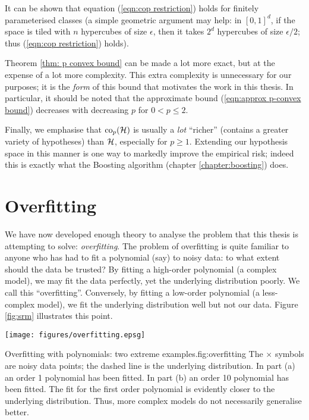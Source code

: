 It can be shown that equation (\ref{eqn:cop restriction}) holds for
finitely parameterised classes (a simple geometric argument may help:
in $[0,1]^d$, if the space is tiled with $n$ hypercubes of size
$\epsilon$, then it takes $2^d$ hypercubes of size $\epsilon/2$; thus
(\ref{eqn:cop restriction}) holds).
 
Theorem \ref{thm: p convex bound} can be made a lot more exact, but at
the expense of a lot more complexity.  This extra complexity is
unnecessary for our purposes; it is the \emph{form} of this bound that
motivates the work in this thesis. In particular, it should be noted
that the approximate bound (\ref{eqn:approx p-convex bound}) decreases
with decreasing $p$ for $0 < p \leq 2$.

Finally, we emphasise that $\mathrm{co}_{p}(\mathcal{H})$ is usually a \emph{lot}
``richer'' (contains a greater variety of hypotheses) than $\mathcal{H}$,
especially for $p \geq 1$.  Extending our hypothesis space in this
manner is one way to markedly improve the empirical risk; indeed this
is exactly what the Boosting algorithm (chapter
\ref{chapter:boosting}) does.


\section{Overfitting}
\label{sec:overfitting}

We have now developed enough theory to analyse the problem that
this thesis is attempting to solve: \emph{overfitting}.  The problem
of overfitting is quite familiar to anyone who has had to fit a
polynomial (say) to noisy data: to what extent should the data be
trusted?  By fitting a high-order polynomial (a complex model), we may
fit the data perfectly, yet the underlying distribution poorly.  We
call this ``overfitting''.  Conversely, by fitting a low-order
polynomial (a less-complex model), we fit the underlying distribution
well but not our data.  Figure \ref{fig:srm} illustrates this
point.

\begin{linefigure}
\begin{center}
\texttt{[image: figures/overfitting.epsg]}
\end{center}
\begin{capt}{Overfitting with polynomials: two extreme
examples.}{fig:overfitting}
The $\times$ symbols are noisy data points; the dashed line is the
underlying distribution.  In part (a) an order 1 polynomial has been
fitted.  In part (b) an order 10 polynomial has been fitted.  The fit
for the first order polynomial is evidently closer to the underlying
distribution.  Thus, more complex models do not necessarily generalise
better.
\end{capt}
\end{linefigure}

